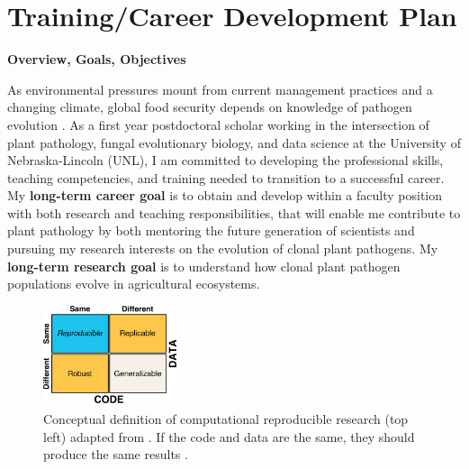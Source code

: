 \documentclass[12pt,letterpaper]{article}
\title{\ruleline{Project Narrative}}
\begin{document}
\maketitle


\section{Training/Career Development Plan}
\noindent \textbf{Overview, Goals, Objectives}

As environmental pressures mount from current management practices and a changing climate, global food security depends on knowledge of pathogen evolution \citep{croll2016genetic,grunwald2016population,stukenbrock2013evolution}. 
As a first year postdoctoral scholar working in the intersection of plant pathology, fungal evolutionary biology, and data science at the University of Nebraska-Lincoln (UNL), I am committed to developing the professional skills, teaching competencies, and training needed to transition to a successful career. 
My \textbf{long-term career goal} is to obtain and develop within a faculty position with both research and teaching responsibilities, that will enable me contribute to plant pathology by both mentoring the future generation of scientists and pursuing my research interests on the evolution of clonal plant pathogens. 
My \textbf{long-term research goal} is to understand how clonal plant pathogen populations evolve in agricultural ecosystems. 
\begin{figure}
  \includegraphics[width=0.35\textwidth]{figure/whitaker2017publishing.pdf}
  \caption{Conceptual definition of computational reproducible research (top left) adapted from \citet{whitaker2017publishing}. If the code and data are the same, they should produce the same results \citep{patil2016statistical}.
  }
  \label{fig:rr-def}
\end{figure}
\end{document}
